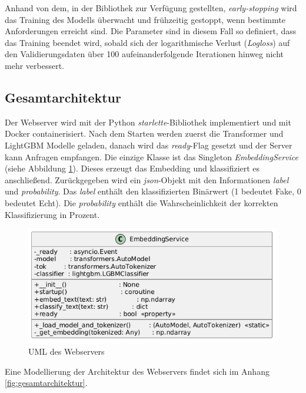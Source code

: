 Anhand von dem, in der Bibliothek zur Verfügung gestellten, \textit{early-stopping} wird das Training des Modells überwacht und frühzeitig gestoppt, wenn bestimmte 
Anforderungen erreicht sind. 
Die Parameter sind in diesem Fall so definiert, dass das Training beendet wird, sobald sich der logarithmische Verlust (\textit{Logloss}) auf den 
Validierungsdaten über 100 aufeinanderfolgende Iterationen hinweg nicht mehr verbessert. %

\subsection{Gesamtarchitektur}

Der Webserver wird mit der Python \textit{starlette}-Bibliothek implementiert und mit Docker containerisiert.
Nach dem Starten werden zuerst die Transformer und LightGBM Modelle geladen, danach wird das \textit{ready}-Flag gesetzt und der Server kann Anfragen empfangen.
Die einzige Klasse ist das Singleton \textit{EmbeddingService} (siehe Abbildung \ref{fig:uml_webserver}). Dieses erzeugt das Embedding und klassifiziert es anschließend.
Zurückgegeben wird ein \textit{json}-Objekt mit den Informationen \textit{label} und \textit{probability}. Das \textit{label} enthält den klassifizierten Binärwert 
(1 bedeutet Fake, 0 bedeutet Echt). Die \textit{probability} enthält die Wahrscheinlichkeit der korrekten Klassifizierung in Prozent.

\begin{figure}[htbp]
    \begin{center}
        \includegraphics[scale=0.55]{static/uml_webserver.png}
        \caption{\label{fig:uml_webserver} UML des Webservers}
    \end{center}
\end{figure}

Eine Modellierung der Architektur des Webservers findet sich im Anhang \ref{fig:gesamtarchitektur}.

